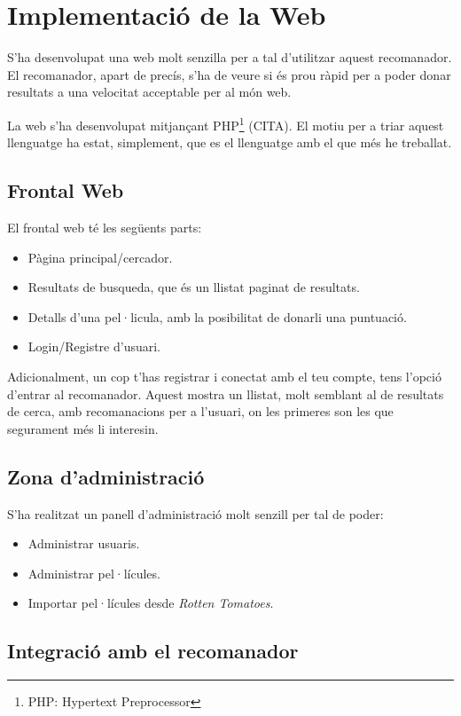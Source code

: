 \chapter{Implementació de la Web}

S'ha desenvolupat una web molt senzilla per a tal d'utilitzar aquest recomanador. El recomanador, apart de precís, s'ha de veure si és prou ràpid per a poder donar resultats a una velocitat acceptable per al món web.

La web s'ha desenvolupat mitjançant PHP\footnote{PHP: Hypertext Preprocessor} (CITA). El motiu per a triar aquest llenguatge ha estat, simplement, que es el llenguatge amb el que més he treballat.

\section{Frontal Web}

El frontal web té les següents parts:

\begin{itemize}
	\item Pàgina principal/cercador.
	\item Resultats de busqueda, que és un llistat paginat de resultats.
	\item Detalls d'una pel·licula, amb la posibilitat de donarli una puntuació.
	\item Login/Registre d'usuari.
\end{itemize}

Adicionalment, un cop t'has registrar i conectat amb el teu compte, tens l'opció d'entrar al recomanador. Aquest mostra un llistat, molt semblant al de resultats de cerca, amb recomanacions per a l'usuari, on les primeres son les que segurament més li interesin.

\section{Zona d'administració}

S'ha realitzat un panell d'administració molt senzill per tal de poder:

\begin{itemize}
	\item Administrar usuaris.
	\item Administrar pel·lícules.
	\item Importar pel·lícules desde \emph{Rotten Tomatoes}.
\end{itemize}

\section{Integració amb el recomanador}

